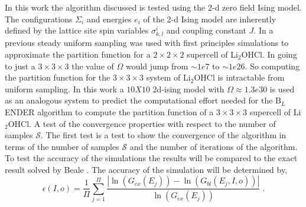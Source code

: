 \documentclass[twocolumn]{article}
\begin{document}
In this work the algorithm discussed is tested using the 2-d zero field  Ising model.  The configurations $\Sigma_i$ and energies $e_i$ of the 2-d Ising model are inherently defined by the lattice site spin variables $\sigma^i_{k,l}$ and coupling constant $J$. In a previous steady uniform sampling was used with first principles simulations to approximate the partition function for a $2\times 2\times 2$ supercell  of Li$_2$OHCl. In going to just a $3\times 3\times 3$ the value of $\Omega$ would jump from $\sim1e7$ to  $\sim1e26$. So computing the partition function for the $3\times 3\times 3$ system of Li$_2$OHCl is intractable from uniform sampling. In this work a $10X10$ 2d-ising model with $\Omega \approx 1.3e30$ is used as an analogous system to predict the computational effort needed for the B$_L$ENDER algorithm to compute the partition function of a  $3\times 3\times 3$ supercell of Li$_2$OHCl.   A test of the convergence properties with respect to the number of samples $\mathcal{S}$. The first test is a test to show the convergence of the algorithm in terms of the number of samples $\mathcal{S}$ and the number of iterations of the algorithm. To test the accuracy of the simulations the results will be compared to the exact result solved by Beale \cite{Beale_2d_ising}. The accuracy of the simulation will be determined by, 
\begin{equation}
\epsilon(I,o)  = \frac{1}{\Pi} \sum_{j=1}^{\Pi}\frac{|\ln(G_{ex}(E_j))- \ln(G_{bl}(E_j,I,o))|}{\ln(G_{ex}(E_j))}\; . 
\end{equation}
\end{document}
